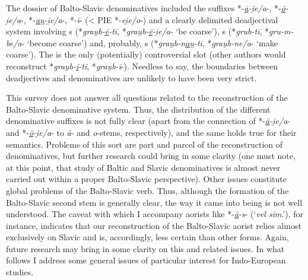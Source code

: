 \documentclass[output=paper,colorlinks,citecolor=brown]{langscibook}
\begin{document}
The dossier of Balto-Slavic denominatives  included the suffixes *-\textit{\underline{ā}-i̯e/a}-, \mbox{*-\textit{\underline{ō}-i̯e/a}-}, \mbox{*-\textit{\underline{au̯}-i̯e/a}-}, *-\textit{ī}- (< PIE *-\textit{ei̯e/o}-) and a clearly delimited deadjectival  system involving s (*\textit{grau̯b-\underline{ē}-tī}, *\textit{grau̯b-\underline{ē}-i̯e/a}- ‘be coarse’), s (*\textit{grub-tī}, \mbox{*\textit{gru-m-be/a}-} ‘become coarse’) and, probably, s (*\textit{grau̯b-n\underline{au̯}-tī}, *\textit{grau̯b-ne/a}- ‘make coarse’). The  is the only (potentially) controversial slot (other authors would reconstruct *\textit{grau̯b-\underline{ī}-tī}, *\textit{grau̯b-ī}-). Needless to say, the boundaries between deadjectives  and denominatives  are unlikely to have been very strict.

This survey does not answer all questions related to the reconstruction of the Balto-Slavic denominative system. Thus, the distribution of the different denominative suffixes is not fully clear (apart from the connection of *-\textit{\underline{ā}-i̯e/a}- and *\nobreakdash-\textit{\underline{ō}\nobreakdash-i̯e/a}- to \textit{ā}- and \textit{o}-stems, respectively), and the same holds true for their semantics. Problems of this sort are part and parcel of the reconstruction of denominatives, but further research could bring in some clarity (one must note, at this point, that study of Baltic and Slavic denominatives  is almost never carried out within a proper Balto-Slavic perspective). Other issues constitute global problems of the Balto-Slavic verb. Thus, although the formation of the Balto-Slavic second stem is generally clear, the way it came into being is not well understood. The caveat with which I accompany aorists like *-\textit{\underline{ā}-s}- (‘\textit{vel sim}.’), for instance, indicates that our reconstruction of the Balto-Slavic aorist relies almost exclusively on Slavic and is, accordingly, less certain than other forms. Again, future research may bring in some clarity on this and related issues. In what follows I address some general issues of particular interest for Indo-European studies.
\end{document}
